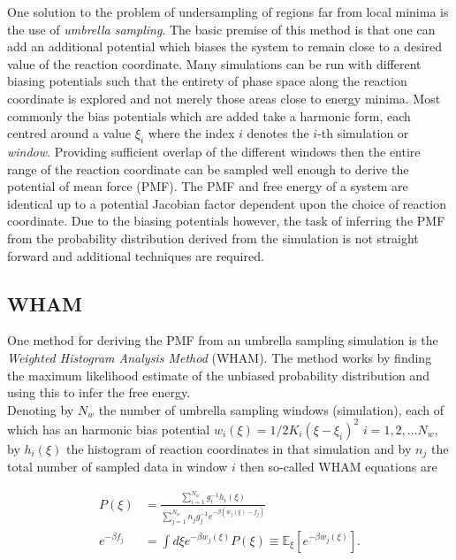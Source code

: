 \documentclass[12pt, onecolumn]{revtex4}    %
\begin{document}
One solution to the problem of undersampling of regions far from local minima is the use of \textit{umbrella sampling}\cite{Umbrella}.  The basic premise of this method is that one can add an additional potential which biases the system to remain close to a desired value of the reaction coordinate.  Many simulations can be run with different biasing potentials such that the entirety of phase space along the reaction coordinate is explored and not merely those areas close to energy minima\cite{Umbrella}.  Most commonly the bias potentials which are added take a harmonic form, each centred around a value $\xi_i$ where the index $i$ denotes the $i$-th simulation or \textit{window}\cite{GWHAM}.  Providing sufficient overlap of the different windows then the entire range of the reaction coordinate can be sampled well enough to derive the potential of mean force (PMF)\cite{GWHAM}.  The PMF and free energy of a system are identical up to a potential Jacobian factor dependent upon the choice of reaction coordinate\cite{PMF}.  Due to the biasing potentials however, the task of inferring the PMF from the probability distribution derived from the simulation is not straight forward and additional techniques are required.

\subsection{WHAM}

One method for deriving the PMF from an umbrella sampling simulation is the \textit{Weighted Histogram Analysis Method} (WHAM)\cite{Umbrella}\cite{GWHAM}.  The method works by finding the maximum likelihood estimate of the unbiased probability distribution and using this to infer the free energy.\\

Denoting by $N_w$ the number of umbrella sampling windows (simulation), each of which has an harmonic bias potential  $w_i (\xi) = 1/2 K_i (\xi - \xi_i)^2$ $ i = 1, 2,... N_w$, by $h_i(\xi)$ the histogram of reaction coordinates in that simulation and by $n_j$ the total number of sampled data in window $i$ then so-called WHAM equations are\cite{GWHAM}

\begin{align} 
\label{eq: WHAM}
P(\xi) &= \frac{\sum_{i =1}^{N_w}g_i ^{-1} h_i (\xi)}{\sum_{j =1}^{N_w} n_j g_j^{-1} e^{- \beta (w_j (\xi) - f_j)}}\\
e^{-\beta f_j} &= \int d \xi e^{-\beta w_j(\xi)} P(\xi) \equiv \mathbb{E} _\xi\left[e^{-\beta w_j(\xi)} \right].
\end{align}
\end{document}
